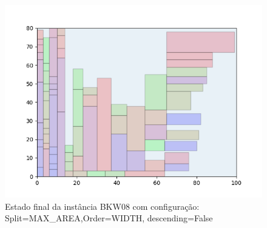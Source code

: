 \begin{figure}[H]
    \centering
    \caption[]{Estado final da instância BKW08 com configuração: Split=MAX_AREA,Order=WIDTH, descending=False}
    \label{fig:bkw08-max_area-width-false}
    \includegraphics[scale=0.5]{output/figures/bkw/bkw08/max_area/width/false/00}
\end{figure}